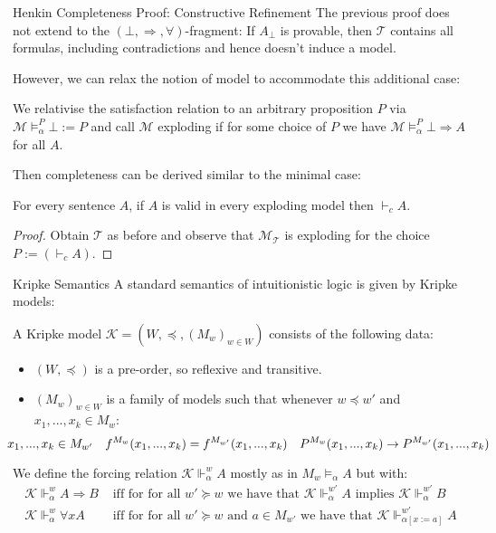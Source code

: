 \documentclass[xcolor=dvipsnames,aspectratio=169,handout]{beamer}
\renewcommand{\to}{\Rightarrow}
\newcommand{\TT}{\mathcal{T}}
\newcommand{\MM}{\mathcal{M}}
\newcommand{\KK}{\mathcal{K}}
\begin{document}
\begin{frame}{Henkin Completeness Proof: Constructive Refinement}
	The previous proof does not extend to the $(\bot,\to,\forall)$-fragment:
	If $A_\bot$ is provable, then $\TT$ contains all formulas, including contradictions and hence doesn't induce a model.
	
	\vspace{0.3cm}
	\pause
	However, we can relax the notion of model to accommodate this additional case:
	\pause
	\begin{definition}
		We relativise the satisfaction relation to an arbitrary proposition $P$ via $\MM \vDash^P_\alpha \bot:= P$ and call $\MM$ exploding if for some choice of $P$ we have $\MM\vDash^P_\alpha \bot \to A$ for all $A$.
	\end{definition}
	
	\vspace{0.3cm}
	\pause
	Then completeness can be derived similar to the minimal case:
	\begin{theorem}
		For every sentence $A$, if $A$ is valid in every exploding model then $\vdash_c A$.
	\end{theorem}
	\pause
	\begin{proof}
		Obtain $\TT$ as before and observe that $\MM_\TT$ is exploding for the choice $P:=(\vdash_c A)$.
	\end{proof}
\end{frame}

\begin{frame}{Kripke Semantics}
	\pause
	A standard semantics of intuitionistic logic is given by Kripke models:
	\pause
	\begin{definition}
		A Kripke model $\KK=(W,\preceq, (M_w)_{w\in W})$ consists of the following data:
		\begin{itemize}
			\item $(W,\preceq)$ is a pre-order, so reflexive and transitive.
			\item $(M_w)_{w\in W}$ is a family of models such that whenever $w\preceq w'$ and $x_1,...,x_k\in M_w$:
			$$\hspace{-0.8cm}x_1,...,x_k\in M_{w'}
			\hspace{1em}
			f^{M_{w}}(x_1,...,x_k)=f^{M_{w'}}(x_1,...,x_k)
			\hspace{1em}
			P^{M_{w}}(x_1,...,x_k)\rightarrow P^{M_{w'}}(x_1,...,x_k)
			$$
		\end{itemize}
		\pause
		We define the forcing relation $\KK\Vdash^w_\alpha A$ mostly as in $M_w\vDash_\alpha A$ but with:
		\begin{align*}
			\KK\Vdash^w_\alpha A\to B&\text{ iff for for all $w'\succeq w$ we have that $\KK\Vdash^{w'}_\alpha A$ implies $\KK\Vdash^{w'}_\alpha B$}\\
			\KK\Vdash^w_\alpha \forall x A&\text{ iff for for all $w'\succeq w$ and $a\in M_{w'}$ we have that $\KK\Vdash^{w'}_{\alpha[x:=a]} A$}
		\end{align*}
	\end{definition}
\end{frame}
\end{document}
